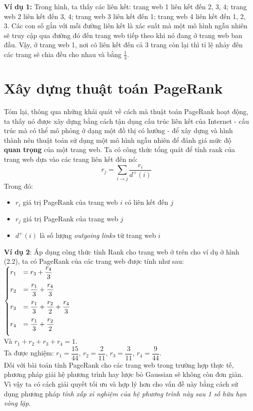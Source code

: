 \textbf{Ví dụ 1:} Trong hình, ta thấy các liên kết: trang web 1 liên kết đến 2, 3, 4; trang web 2 liên kết đến 3, 4; trang web 3 liên kết đến 1; trang web 4 liên kết đến 1, 2, 3. Các con số gắn với mỗi đường liên kết là xác suất mà một mô hình ngẫu nhiên sẽ truy cập qua đường đó đến trang web tiếp theo khi nó đang ở trang web ban đầu. Vậy, ở trang web 1, nơi có liên kết đến cả 3 trang còn lại thì tỉ lệ nhảy đến các trang sẽ chia đều cho nhau và bằng $\displaystyle\frac{1}{3}$.
\section{Xây dựng thuật toán PageRank}
Tóm lại, thông qua những khái quát về cách mà thuật toán PageRank hoạt động, ta thấy nó được xây dựng bằng cách tận dụng cấu trúc liên kết của Internet - cấu trúc mà có thể mô phỏng ở dạng một đồ thị có hướng - để xây dựng và hình thành nên thuật toán sử dụng một mô hình ngẫu nhiên để đánh giá mức độ \textbf{quan trọng} của một trang web.\newline\newline
Ta có công thức tổng quát để tính rank của trang web dựa vào các trang liên kết đến nó:$$\boxed{r_j = \displaystyle\sum_{i \to j}^{}{\displaystyle\frac{r_i}{d^+(i)}}}$$
\noindent Trong đó:
\begin{itemize}
    \item $r_i$ giá trị PageRank của trang web $i$ có liên kết đến $j$
    \item $r_j$ giá trị PageRank của trang web $j$ 
    \item $d^{+}(i)$ là số lượng \emph{outgoing links} từ trang web $i$
\end{itemize}
\textbf{Ví dụ 2}: Áp dụng công thức tính Rank cho trang web ở trên cho ví dụ ở hình (2.2), ta có PageRank của các trang web được tính như sau: \\
$
\begin{cases}
     r_1 &= r_3 + \dfrac{r_4}{3}\\[10pt]
     r_2 &= \dfrac{r_1}{3} + \dfrac{r_4}{3}\\[10pt]
     r_3 &= \dfrac{r_1}{3} + \dfrac{r_2}{2} + \dfrac{r_4}{3}\\[10pt]
     r_4 &= \dfrac{r_1}{3} + \dfrac{r_2}{2}\\[10pt]
\end{cases}\\
$\\
Và $r_1 + r_2 + r_3 + r_4 = 1$.\\[10pt]
Ta được nghiệm: $r_1 = \dfrac{15}{44}$, $r_2 = \dfrac{2}{11}$, $r_3 = \dfrac{3}{11}$, $r_4 = \dfrac{9}{44}$.\\[10pt]
\indent Đối với bài toán tính PageRank cho các trang web trong trường hợp thực tế, phương pháp giải hệ phương trình hay lược bỏ Gaussian sẽ không còn đơn giản. Vì vậy ta có cách giải quyết tối ưu và hợp lý hơn cho vấn đề này bằng cách sử dụng phương pháp \emph{tính xấp xỉ nghiệm của hệ phương trình này sau 1 số hữu hạn vòng lặp}.

